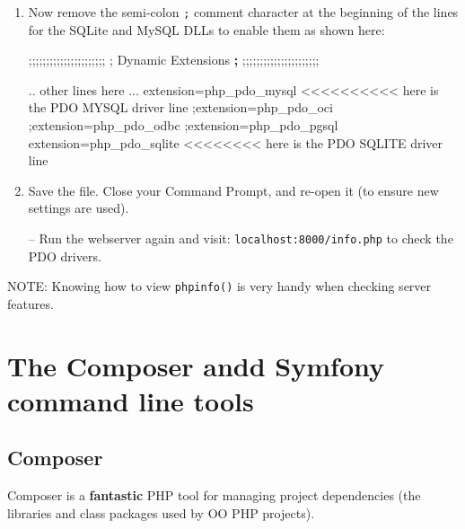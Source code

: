 \documentclass[a4paperpaper,openright]{book}
\newenvironment{Shaded}{}{}
\newcommand{\ExtensionTok}[1]{#1}
\newcommand{\KeywordTok}[1]{\textcolor[rgb]{0.00,0.44,0.13}{\textbf{#1}}}
\newcommand{\NormalTok}[1]{#1}
\newcommand{\OperatorTok}[1]{\textcolor[rgb]{0.40,0.40,0.40}{#1}}
\newcommand{\VariableTok}[1]{\textcolor[rgb]{0.10,0.09,0.49}{#1}}
\begin{document}
\begin{enumerate}
\def\labelenumi{\arabic{enumi}.}
\setcounter{enumi}{1}
\item
  Now remove the semi-colon \texttt{;} comment character at the
  beginning of the lines for the SQLite and MySQL DLLs to enable them as
  shown here:

\begin{Shaded}
\begin{Highlighting}[]
\NormalTok{    ;;;;;;;;;;;;;;;;;;;;;;}
\NormalTok{    ; }\ExtensionTok{Dynamic}\NormalTok{ Extensions }\KeywordTok{;}
\NormalTok{    ;;;;;;;;;;;;;;;;;;;;;;}

    \ExtensionTok{..}\NormalTok{ other lines here ...}
    \VariableTok{extension=}\NormalTok{php_pdo_mysql }\OperatorTok{<<<<<<<<<<} \ExtensionTok{here}\NormalTok{ is the PDO MYSQL driver line}
\NormalTok{    ;}\VariableTok{extension=}\NormalTok{php_pdo_oci}
\NormalTok{    ;}\VariableTok{extension=}\NormalTok{php_pdo_odbc}
\NormalTok{    ;}\VariableTok{extension=}\NormalTok{php_pdo_pgsql}
    \VariableTok{extension=}\NormalTok{php_pdo_sqlite }\OperatorTok{<<<<<<<<  here} \ExtensionTok{is}\NormalTok{ the PDO SQLITE driver line}
\end{Highlighting}
\end{Shaded}
\item
  Save the file. Close your Command Prompt, and re-open it (to ensure
  new settings are used).

  -- Run the webserver again and visit: \texttt{localhost:8000/info.php}
  to check the PDO drivers.
\end{enumerate}

NOTE: Knowing how to view \texttt{phpinfo()} is very handy when checking
server features.

\hypertarget{the-composer-andd-symfony-command-line-tools}{%
\chapter{\texorpdfstring{The Composer andd Symfony command line
tools\label{cli_tools}}{The Composer andd Symfony command line tools}}\label{the-composer-andd-symfony-command-line-tools}}

\hypertarget{composer}{%
\section{Composer}\label{composer}}

Composer is a \textbf{fantastic} PHP tool for managing project
dependencies (the libraries and class packages used by OO PHP projects).
\end{document}

